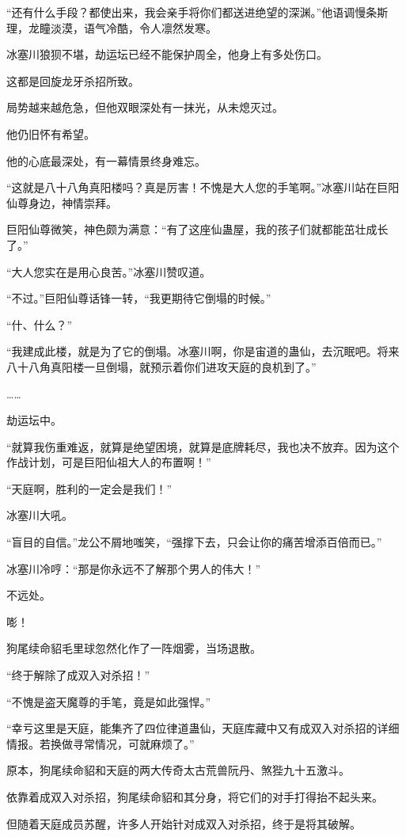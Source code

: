 \begin{this_body}
“还有什么手段？都使出来，我会亲手将你们都送进绝望的深渊。”他语调慢条斯理，龙瞳淡漠，语气冷酷，令人凛然发寒。

冰塞川狼狈不堪，劫运坛已经不能保护周全，他身上有多处伤口。

这都是回旋龙牙杀招所致。

局势越来越危急，但他双眼深处有一抹光，从未熄灭过。

他仍旧怀有希望。

他的心底最深处，有一幕情景终身难忘。

“这就是八十八角真阳楼吗？真是厉害！不愧是大人您的手笔啊。”冰塞川站在巨阳仙尊身边，神情崇拜。

巨阳仙尊微笑，神色颇为满意：“有了这座仙蛊屋，我的孩子们就都能茁壮成长了。”

“大人您实在是用心良苦。”冰塞川赞叹道。

“不过。”巨阳仙尊话锋一转，“我更期待它倒塌的时候。”

“什、什么？”

“我建成此楼，就是为了它的倒塌。冰塞川啊，你是宙道的蛊仙，去沉眠吧。将来八十八角真阳楼一旦倒塌，就预示着你们进攻天庭的良机到了。”

……

劫运坛中。

“就算我伤重难返，就算是绝望困境，就算是底牌耗尽，我也决不放弃。因为这个作战计划，可是巨阳仙祖大人的布置啊！”

“天庭啊，胜利的一定会是我们！”

冰塞川大吼。

“盲目的自信。”龙公不屑地嗤笑，“强撑下去，只会让你的痛苦增添百倍而已。”

冰塞川冷哼：“那是你永远不了解那个男人的伟大！”

不远处。

嘭！

狗尾续命貂毛里球忽然化作了一阵烟雾，当场退散。

“终于解除了成双入对杀招！”

“不愧是盗天魔尊的手笔，竟是如此强悍。”

“幸亏这里是天庭，能集齐了四位律道蛊仙，天庭库藏中又有成双入对杀招的详细情报。若换做寻常情况，可就麻烦了。”

原本，狗尾续命貂和天庭的两大传奇太古荒兽阮丹、煞狴九十五激斗。

依靠着成双入对杀招，狗尾续命貂和其分身，将它们的对手打得抬不起头来。

但随着天庭成员苏醒，许多人开始针对成双入对杀招，终于是将其破解。


\end{this_body}

